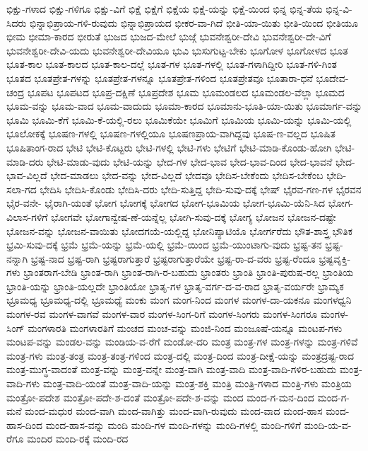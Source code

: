 {ಭಿಕ್ಷು-ಗಳಾದ
ಭಿಕ್ಷು-ಗಳಿಗೂ
ಭಿಕ್ಷು-ವಿಗೆ
ಭಿಕ್ಷೆ
ಭಿಕ್ಷೆಗೆ
ಭಿಕ್ಷೆಯ
ಭಿಕ್ಷೆ-ಯನ್ನು
ಭಿಕ್ಷೆ-ಯಿಂದ
ಭಿನ್ನ
ಭಿನ್ನ-ತೆಯ
ಭಿನ್ನ-ವಿ-ಸಿದರು
ಭಿನ್ನಾಭಿಪ್ರಾಯ-ಗಳಿ-ರುವುದು
ಭಿನ್ನಾಭಿಪ್ರಾಯದ
ಭೀಕರ-ವಾ-ಗಿದೆ
ಭೀತಿ-ಯಾ-ಯಿತು
ಭೀತಿ-ಯಿಂದ
ಭೀತಿಯೂ
ಭೀಮ
ಭೀಮಾ-ಕಾರದ
ಭೀರುತೆ
ಭುಜದ
ಭುಜದ-ಮೇಲೆ
ಭುಜ್ಗೆ
ಭುವನೇಶ್ವರೀ-ದೇವಿ
ಭುವನೇಶ್ವರೀ-ದೇ-ವಿಗೆ
ಭುವನೇಶ್ವರೀ-ದೇವಿ-ಯದು
ಭುವನೇಶ್ವರೀ-ದೇವಿಯೂ
ಭುವಿ
ಭುಸುಗುಟ್ಟ-ಬೇಕು
ಭೂಗೋಳ
ಭೂಗೋಳದ
ಭೂತ
ಭೂತ-ಕಾಲ
ಭೂತ-ಕಾಲದ
ಭೂತ-ಕಾಲ-ದಲ್ಲೆ
ಭೂತ-ಗಳ
ಭೂತ-ಗಳಲ್ಲಿ
ಭೂತ-ಗಳಾಗಿದ್ದೀರಿ
ಭೂತ-ಗಳಿ-ಗಿಂತ
ಭೂತದ
ಭೂತಪ್ರೇತ-ಗಳನ್ನು
ಭೂತಪ್ರೇತ-ಗಳನ್ನೂ
ಭೂತಪ್ರೇತ-ಗಳಿಂದ
ಭೂತಪ್ರೇತವೂ
ಭೂತಾರಾ-ಧನೆ
ಭೂದೇವ-ಚಂದ್ರ
ಭೂಪಟ
ಭೂಪಟದ
ಭೂಪ್ರ-ದಕ್ಷಿಣೆ
ಭೂಪ್ರದೇಶ
ಭೂಮ
ಭೂಮಂಡಲದ
ಭೂಮಂಡಲ-ವೆಲ್ಲಾ
ಭೂಮದ
ಭೂಮ-ವನ್ನು
ಭೂಮ-ವಾದ
ಭೂಮ-ವಾದುದು
ಭೂಮಾ-ಕಾರದ
ಭೂಮಾನು-ಭೂತಿ-ಯಾ-ಯಿತು
ಭೂಮಾರ್ಗ-ವನ್ನು
ಭೂಮಿ
ಭೂಮಿ-ಕೆಗೆ
ಭೂಮಿ-ಕೆ-ಯಲ್ಲಿ-ರಲು
ಭೂಮಿಕೆಯೇ
ಭೂಮಿಗೆ
ಭೂಮಿಯ
ಭೂಮಿ-ಯನ್ನು
ಭೂಮಿ-ಯಲ್ಲಿ
ಭೂಲೋಕಕ್ಕೆ
ಭೂಷಣ-ಗಳಲ್ಲಿ
ಭೂಷಣ-ಗಳಲ್ಲಿಯೂ
ಭೂಷಣಪ್ರಾಯ-ವಾಗಿದ್ದವು
ಭೂಷ-ಣ-ವಲ್ಲದ
ಭೂಷಿತ
ಭೂಷಿತಾಂಗ-ರಾದ
ಭೇಟಿ
ಭೇಟಿ-ಕೊಟ್ಟರು
ಭೇಟಿ-ಗಳಲ್ಲಿ
ಭೇಟಿ-ಗಳು
ಭೇಟಿಗೆ
ಭೇಟಿ-ಮಾಡಿ-ಕೊಂಡು-ಹೋಗಿ
ಭೇಟಿ-ಮಾಡಿ-ದರು
ಭೇಟಿ-ಮಾಡು-ವುದು
ಭೇಟಿ-ಯನ್ನು
ಭೇದ-ಗಳ
ಭೇದ-ಭಾವ
ಭೇದ-ಭಾವ-ದಿಂದ
ಭೇದ-ಭಾವನೆ
ಭೇದ-ಭಾವ-ವಿಲ್ಲದೆ
ಭೇದ-ಮಾಡಲು
ಭೇದ-ವನ್ನು
ಭೇದ-ವಿಲ್ಲದೆ
ಭೇದವೂ
ಭೇದಿಸ-ಬೇಕೆಂದು
ಭೇದಿಸ-ಬೇಕೆಂಬ
ಭೇದಿ-ಸಲಾ-ಗದ
ಭೇದಿಸಿ
ಭೇದಿಸಿ-ಕೊಂಡು
ಭೇದಿಸಿ-ದರು
ಭೇದಿ-ಸುತ್ತಿದ್ದ
ಭೇದಿ-ಸುವು-ದಕ್ಕೆ
ಭೇಷ್
ಭೈರವ-ಗಣ-ಗಳ
ಭೈರವನ
ಭೈರ-ವನೇ-
ಭೈರಾಗಿ-ಯಂತೆ
ಭೋಗ
ಭೋಗಕ್ಕೆ
ಭೋಗದ
ಭೋಗ-ಭೂಮಿಯ
ಭೋಗ-ಭೂಮಿ-ಯೆನಿ-ಸಿದ
ಭೋಗ-ವಿಲಾಸ-ಗಳಿಗೆ
ಭೋಗವೇ
ಭೋಗಾನ್ವೇಷ-ಣೆ-ಯನ್ನೆಲ್ಲ
ಭೋಗಿ-ಸುವು-ದಕ್ಕೆ
ಭೋಗ್ಯ
ಭೋಜನ
ಭೋಜನ-ದಷ್ಟೇ
ಭೋಜನ-ವನ್ನು
ಭೋಜನ-ವಾಯಿತು
ಭೋದಗಯೆ-ಯಲ್ಲಿದ್ದ
ಭೋನಿಪ್ಯಾಟಿಯೊ
ಭೋರ್ಗರೆದು
ಭೌತ-ಶಾಸ್ತ್ರ
ಭೌತಿಕ
ಭ್ರಮಿ-ಸುವು-ದಕ್ಕೆ
ಭ್ರಮೆ
ಭ್ರಮೆ-ಯನ್ನು
ಭ್ರಮೆ-ಯಲ್ಲಿ
ಭ್ರಮೆ-ಯಿಂದ
ಭ್ರಮೆ-ಯುಂಟಾಗು-ವುದು
ಭ್ರಷ್ಟ-ತನ
ಭ್ರಷ್ಟ-ನನ್ನಾಗಿ
ಭ್ರಷ್ಟ-ನಾದ
ಭ್ರಷ್ಟ-ರಾಗಿ
ಭ್ರಷ್ಟರಾಗುತ್ತಾರೆ
ಭ್ರಷ್ಟರಾಗುತ್ತಾರೆಯೇ
ಭ್ರಷ್ಟ-ರಾ-ದ-ವರು
ಭ್ರಷ್ಟ-ರೆಂದೂ
ಭ್ರಷ್ಟವೃಕ್ತಿ-ಗಳು
ಭ್ರಾಂತರಾಗ-ಬೇಡಿ
ಭ್ರಾಂತ-ರಾಗಿ
ಭ್ರಾಂತ-ರಾಗಿ-ರ-ಬಹುದು
ಭ್ರಾಂತರು
ಭ್ರಾಂತಿ
ಭ್ರಾಂತಿ-ಪುರುಷ-ರಲ್ಲ
ಭ್ರಾಂತಿಯ
ಭ್ರಾಂತಿ-ಯನ್ನು
ಭ್ರಾಂತಿ-ಯಲ್ಲದೇ
ಭ್ರಾಂತಿಯೋ
ಭ್ರಾತೃ-ಗಳ
ಭ್ರಾತೃ-ವರ್ಗ-ದ-ವ-ರಾದ
ಭ್ರಾತೃ-ವರ್ಯರೇ
ಭ್ರಾಮ್ಯಕ
ಭ್ರೂಮಧ್ಯ
ಭ್ರೂಮಧ್ಯ-ದಲ್ಲಿ
ಭ್ರೂಮಧ್ಯೆ
ಮಂಕು
ಮಂಗ
ಮಂಗ-ನಿಂದ
ಮಂಗಳ
ಮಂಗಳ-ದಾ-ಯಕನೂ
ಮಂಗಳಧ್ವನಿ
ಮಂಗಳ-ರವ
ಮಂಗಳ-ವಾಗವೆ
ಮಂಗಳ-ವಾರ
ಮಂಗಳ-ಸಿಂಗ-ರಿಗೆ
ಮಂಗಳ-ಸಿಂಗರು
ಮಂಗಳ-ಸಿಂಗರೂ
ಮಂಗಳ-ಸಿಂಗ್
ಮಂಗಳಾರತಿ
ಮಂಗಳಾರತಿಗೆ
ಮಂಚದ
ಮಂಚ-ವನ್ನು
ಮಂಜಿ-ನಿಂದ
ಮಂಜೂಷೆ-ಯನ್ನೂ
ಮಂಟಪ-ಗಳು
ಮಂಟಪ-ವನ್ನು
ಮಂಡಲ-ವನ್ನು
ಮಂಡಿಯ-ವ-ರೆಗೆ
ಮಂಡೋ-ದರಿ
ಮಂತ್ರ
ಮಂತ್ರ-ಗಳ
ಮಂತ್ರ-ಗಳನ್ನು
ಮಂತ್ರ-ಗಳಿವೆ
ಮಂತ್ರ-ಗಳು
ಮಂತ್ರ-ತಂತ್ರ
ಮಂತ್ರ-ತಂತ್ರ-ಗಳಿಂದ
ಮಂತ್ರ-ದಲ್ಲಿ
ಮಂತ್ರ-ದಿಂದ
ಮಂತ್ರ-ದೀಕ್ಷೆ-ಯನ್ನು
ಮಂತ್ರದ್ರಷ್ಟ-ರಾದ
ಮಂತ್ರ-ಮುಗ್ಧ-ವಾದಂತೆ
ಮಂತ್ರ-ವನ್ನು
ಮಂತ್ರ-ವನ್ನೇ
ಮಂತ್ರ-ವಾಗಿ
ಮಂತ್ರ-ವಾದಿ
ಮಂತ್ರ-ವಾದಿ-ಗಳಿರ-ಬಹುದು
ಮಂತ್ರ-ವಾದಿ-ಗಳು
ಮಂತ್ರ-ವಾದಿ-ಯಂತೆ
ಮಂತ್ರ-ವಾದಿ-ಯನ್ನು
ಮಂತ್ರ-ಶಕ್ತಿ
ಮಂತ್ರಿ
ಮಂತ್ರಿ-ಗಳಾದ
ಮಂತ್ರಿ-ಗಳು
ಮಂತ್ರಿಯ
ಮಂತ್ರೋ-ಪದೇಶ
ಮಂತ್ರೋ-ಪದೇ-ಶ-ದಂತೆ
ಮಂತ್ರೋ-ಪದೇ-ಶ-ವನ್ನು
ಮಂದ
ಮಂದ-ಗ-ಮನ-ದಿಂದ
ಮಂದ-ಗ-ಮನೆ
ಮಂದ-ಮಧುರ
ಮಂದ-ವಾಗಿ
ಮಂದ-ವಾಗಿತ್ತು
ಮಂದ-ವಾಗಿ-ರುವುದು
ಮಂದ-ವಾದ
ಮಂದ-ಹಾಸ
ಮಂದ-ಹಾಸ-ದಿಂದ
ಮಂದ-ಹಾಸ-ವನ್ನು
ಮಂದಿ
ಮಂದಿ-ಗಳ
ಮಂದಿ-ಗಳನ್ನು
ಮಂದಿ-ಗಳಲ್ಲಿ
ಮಂದಿ-ಗಳಿಗೆ
ಮಂದಿ-ಯ-ವ-ರೆಗೂ
ಮಂದಿರ
ಮಂದಿ-ರಕ್ಕೆ
ಮಂದಿ-ರದ
}

